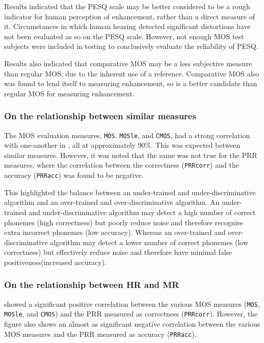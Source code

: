 Results indicated that the \ac{PESQ} scale may be better considered
to be a rough indicator for human perception of enhancement, rather
than a direct measure of it. Circumstances in which human hearing
detected significant distortions have not been evaluated as so on
the \ac{PESQ} scale. However, not enough \ac{MOS} test subjects
were included in testing to conclusively evaluate the reliability
of \ac{PESQ}.

Results also indicated that comparative \ac{MOS} may be a less subjective
measure than regular \ac{MOS}, due to the inherent use of a reference.
Comparative \ac{MOS} also was found to lend itself to measuring enhancement,
so is a better candidate than regular \ac{MOS} for measuring enhancement.


\subsubsection*{On the relationship between similar measures}

The \ac{MOS} evaluation measures, \lstinline!MOS!, \lstinline!MOSle!,
and \lstinline!CMOS!, had a strong correlation with one-another in
, all at approximately 90\%. This was expected between
similar measures. However, it was noted that the same was not true
for the \ac{PRR} measures, where the correlation between the correctness
(\lstinline!PRRcorr!) and the accuracy (\lstinline!PRRacc!) was
found to be negative.

This highlighted the balance between an under-trained and under-discriminative
algorithm and an over-trained and over-discriminative algorithm. An
under-trained and under-discriminative algorithm may detect a high
number of correct phonemes (high correctness) but poorly reduce noise
and therefore recognise extra incorrect phonemes (low accuracy). Whereas
an over-trained and over-discriminative algorithm may detect a lower
number of correct phonemes (low correctness) but effectively reduce
noise and therefore have minimal false positiveness(increased accuracy).


\subsubsection*{On the relationship between \acl{HR} and \acl{MR}}

 showed a significant positive correlation between
the various \ac{MOS} measures (\lstinline!MOS!, \lstinline!MOSle!,
and \lstinline!CMOS!) and the \ac{PRR} measured as correctness (\lstinline!PRRcorr!).
However, the figure also shows an almost as significant negative correlation
between the various \ac{MOS} measures and the \ac{PRR} measured
as accuracy (\lstinline!PRRacc!).

